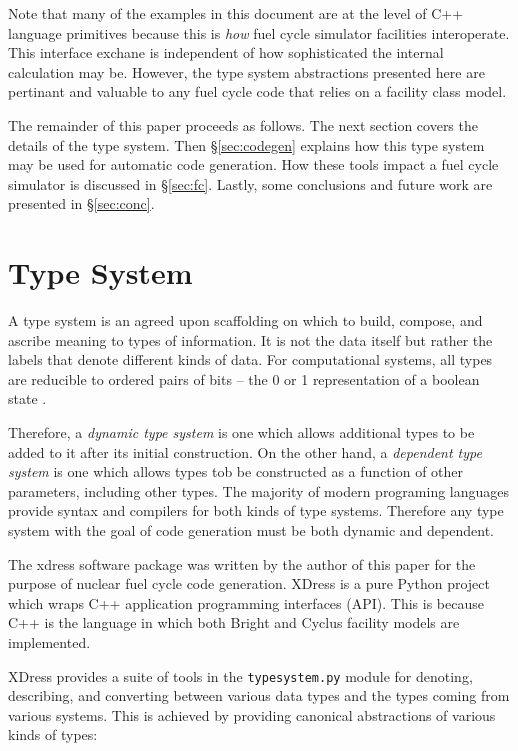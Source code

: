 \documentclass{ansconfpaper}
\newcommand{\vin}[1]{\texttt{{#1}}}
\begin{document}
Note that many of the examples in this document are at the level of C++ language 
primitives because this is \emph{how} fuel cycle simulator facilities interoperate.
This interface exchane is independent of how sophisticated the internal calculation 
may be.  However, the type 
system abstractions presented here are pertinant and valuable to any fuel cycle 
code that relies on a facility class model.

The remainder of this paper proceeds as follows.  The next section covers the 
details of the type system.  Then \S \ref{sec:codegen} explains how this type system
may be used for automatic code generation.  How these tools impact a fuel cycle 
simulator is discussed in \S \ref{sec:fc}.  Lastly, some conclusions and future
work are presented in \S \ref{sec:conc}.

\section{Type System}
\label{sec:ts}

A type system is an agreed upon scaffolding on which to build, compose, and ascribe 
meaning to types of information.  It is not the data itself but rather the labels
that denote different kinds of data.  For computational systems, all types are 
reducible to ordered pairs of bits -- the 0 or 1 representation of a boolean state
\cite{DBLP:journals/jsyml/Church40}.

Therefore, a \emph{dynamic type system} is one which allows additional types to 
be added to it after its initial construction.  On the other hand, a \emph{dependent 
type system} is one which allows types tob be constructed as a function of other 
parameters, including other types.  The majority of modern programing languages 
provide  syntax and compilers for both kinds of type systems.  Therefore any type 
system with the goal of code generation must be both dynamic and dependent.

The xdress software package \cite{xdress} was written by the author of this paper for 
the purpose of nuclear fuel cycle code generation.  XDress is a pure Python 
project which wraps C++ application programming interfaces (API).  This is because
C++ is the language in which both Bright and Cyclus facility models are implemented.

XDress provides a suite of tools in the \vin{typesystem.py} module for denoting, 
describing, and converting
between various data types and the types coming from various systems.  This is
achieved by providing canonical abstractions of various kinds of types:
\end{document}
